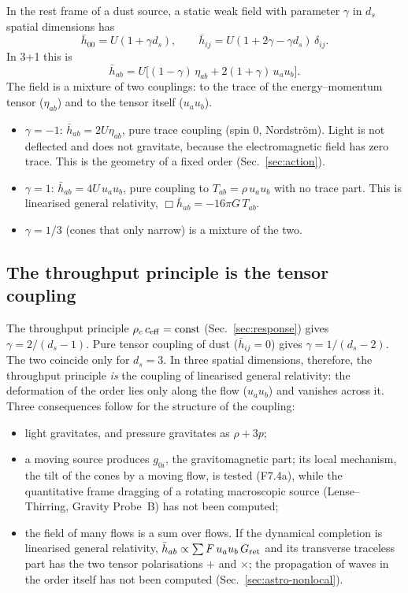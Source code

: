 In the rest frame of a dust source, a static weak field with parameter $\gamma$ in $d_s$ spatial
dimensions has
\begin{equation}
  \bar h_{00}=U(1+\gamma d_s),\qquad \bar h_{ij}=U(1+2\gamma-\gamma d_s)\,\delta_{ij}.
\end{equation}
In 3+1 this is
\begin{equation}\label{eq:hbar-gamma}
  \bar h_{ab}=U\big[(1-\gamma)\,\eta_{ab}+2(1+\gamma)\,u_au_b\big].
\end{equation}
The field is a mixture of two couplings: to the trace of the energy--momentum tensor ($\eta_{ab}$) and
to the tensor itself ($u_au_b$).
\begin{itemize}
\item $\gamma=-1$: $\bar h_{ab}=2U\eta_{ab}$, pure trace coupling (spin 0, Nordstr\"om). Light is not
  deflected and does not gravitate, because the electromagnetic field has zero trace. This is the
  geometry of a fixed order (Sec.~\ref{sec:action}).
\item $\gamma=1$: $\bar h_{ab}=4U\,u_au_b$, pure coupling to $T_{ab}=\rho\,u_au_b$ with no trace part.
  This is linearised general relativity, $\Box\bar h_{ab}=-16\pi G\,T_{ab}$.
\item $\gamma=1/3$ (cones that only narrow) is a mixture of the two.
\end{itemize}

\subsection{The throughput principle is the tensor coupling}

The throughput principle $\rho_c\,c_{\rm eff}=\text{const}$ (Sec.~\ref{sec:response}) gives
$\gamma=2/(d_s-1)$. Pure tensor coupling of dust ($\bar h_{ij}=0$) gives $\gamma=1/(d_s-2)$. The two
coincide only for $d_s=3$. In three spatial dimensions, therefore, the throughput principle \emph{is}
the coupling of linearised general relativity: the deformation of the order lies only along the flow
($u_au_b$) and vanishes across it. Three consequences follow for the structure of the coupling:
\begin{itemize}
\item light gravitates, and pressure gravitates as $\rho+3p$;
\item a moving source produces $g_{0i}$, the gravitomagnetic part; its local mechanism, the tilt of the cones by
  a moving flow, is tested (F7.4a), while the quantitative frame dragging of a rotating macroscopic source (Lense--Thirring,
  Gravity Probe~B) has not been computed;
\item the field of many flows is a sum over flows. If the dynamical completion is linearised general relativity,
  $\bar h_{ab}\propto\sum F\,u_au_b\,G_{\rm ret}$ and its transverse traceless part has the two tensor polarisations
  $+$ and $\times$; the propagation of waves in the order itself has not been computed (Sec.~\ref{sec:astro-nonlocal}).
\end{itemize}

